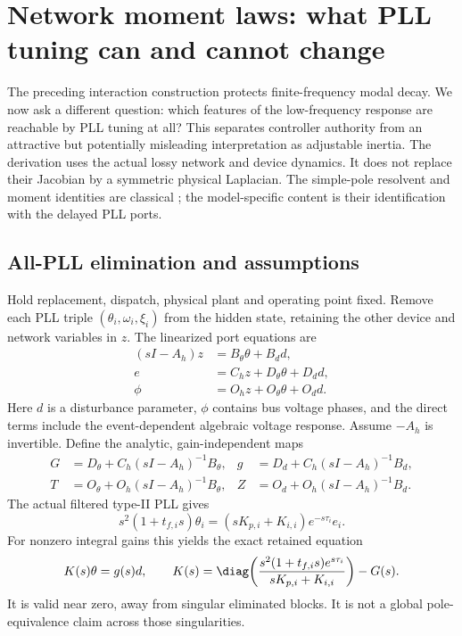 \section{Network moment laws: what PLL tuning can and cannot change}
\label{sec:networkmoments}

The preceding interaction construction protects finite-frequency modal decay.
We now ask a different question: which features of the low-frequency response
are reachable by PLL tuning at all? This separates controller authority from
an attractive but potentially misleading interpretation as adjustable inertia.
The derivation uses the actual lossy network and device dynamics. It does not
replace their Jacobian by a symmetric physical Laplacian. The simple-pole
resolvent and moment identities are classical \cite{beyn,malladamoments};
the model-specific content is their identification with the delayed PLL ports.

\subsection{All-PLL elimination and assumptions}
Hold replacement, dispatch, physical plant and operating point fixed. Remove
each PLL triple $(\theta_i,\omega_i,\xi_i)$ from the hidden state, retaining
the other device and network variables in $z$. The linearized port equations are
\begin{align}
 (sI-A_h)z&=B_\theta\theta+B_d d,\\
 e&=C_hz+D_\theta\theta+D_dd,\\
 \phi&=O_hz+O_\theta\theta+O_dd.
\end{align}
Here $d$ is a disturbance parameter, $\phi$ contains bus voltage phases, and
the direct terms include the event-dependent algebraic voltage response.
Assume $-A_h$ is invertible. Define the analytic, gain-independent maps
\begin{align}
 G&=D_\theta+C_h(sI-A_h)^{-1}B_\theta,&
 g&=D_d+C_h(sI-A_h)^{-1}B_d,\\
 T&=O_\theta+O_h(sI-A_h)^{-1}B_\theta,&
 Z&=O_d+O_h(sI-A_h)^{-1}B_d.
\end{align}
The actual filtered type-II PLL gives
\[
 s^2(1+t_{f,i}s)\theta_i=(sK_{p,i}+K_{i,i})e^{-s\tau_i}e_i.
\]
For nonzero integral gains this yields the exact retained equation
\begin{equation}
 K(s)\theta=g(s)d,\qquad
 K(s)=\diag\!\left(
 \frac{s^2(1+t_{f,i}s)e^{s\tau_i}}{sK_{p,i}+K_{i,i}}
 \right)-G(s).
 \label{eq:momentK}
\end{equation}
It is valid near zero, away from singular eliminated blocks. It is not a
global pole-equivalence claim across those singularities.

